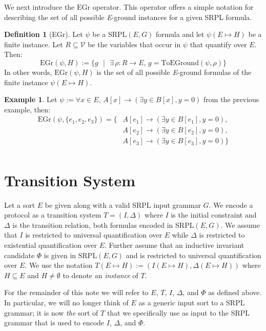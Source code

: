 \documentclass[12pt]{article}
\theoremstyle{definition}
\newtheorem{definition}{Definition}
\newtheorem{example}{Example}
\theoremstyle{remark}
\newcommand{\st}{\text{ }|\text{ }}
\newcommand{\gr}{\text{EGr}}
\newcommand{\SRPL}{\text{SRPL}}
\newcommand{\toground}{\text{ToEGround}}
\begin{document}
We next introduce the $\gr$ operator.  This operator offers a simple notation for describing the set of all possible \textit{E}-ground instances for a given SRPL formula.

\begin{definition}[EGr]
  Let $\psi$ be a $\SRPL(E,G)$ formula and let $\psi(E \mapsto H)$ be a finite instance.  Let $R \subseteq \mathcal{V}$ be the variables that occur in $\psi$ that quantify over $E$.  Then:
  $$\gr(\psi,H) := \{g \st \exists \, \rho : R \to E, \, g = \toground(\psi,\rho)\}$$
  In other words, $\gr(\psi,H)$ is the set of all possible \textit{E}-ground formulas of the finite instance $\psi(E \mapsto H)$.
\end{definition}

\begin{example}
  Let $\psi := \forall x \in E, \, A[x] \rightarrow (\exists y \in B[x], y = 0)$ from the previous example, then:
  \begin{align*}
    \gr(\psi,\{e_1,e_2,e_3\}) = \{&A[e_1] \rightarrow (\exists y \in B[e_1], y = 0),\\
    &A[e_2] \rightarrow (\exists y \in B[e_2], y = 0),\\
    &A[e_3] \rightarrow (\exists y \in B[e_3], y = 0)\}\\
  \end{align*}
\end{example}



\section{Transition System}

Let a sort $E$ be given along with a valid SRPL input grammar $G$.  We encode a protocol as a transition system $T=(I,\Delta)$ where $I$ is the initial constraint and $\Delta$ is the transition relation, both formulas encoded in $\SRPL(E,G)$.  We assume that $I$ is restricted to universal quantification over $E$ while $\Delta$ is restricted to existential quantification over $E$.  Further assume that an inductive invariant candidate $\Phi$ is given in $\SRPL(E,G)$ and is restricted to universal quantification over $E$.  We use the notation $T(E \mapsto H):=(I(E \mapsto H),\Delta(E \mapsto H))$ where $H \subseteq E$ and $H \neq \emptyset$ to denote an \textit{instance} of $T$.

For the remainder of this note we will refer to $E$, $T$, $I$, $\Delta$, and $\Phi$ as defined above.  In particular, we will no longer think of $E$ as a generic input sort to a SRPL grammar; it is now \textit{the} sort of $T$ that we specifically use as input to the SRPL grammar that is used to encode $I$, $\Delta$, and $\Phi$.
\end{document}
